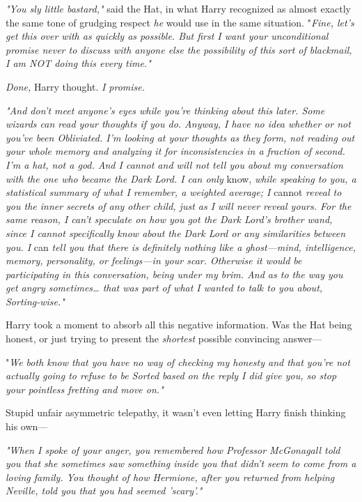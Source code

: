 \emph{"You sly little bastard,"} said the Hat, in what Harry recognized as almost exactly the same tone of grudging respect \emph{he} would use in the same situation. "\emph{Fine, let's get this over with as quickly as possible. But first I want your unconditional promise never to discuss with anyone else the possibility of this sort of blackmail, I am NOT doing this every time."}

\emph{Done,} Harry thought. \emph{I promise.}

\emph{"And don't meet anyone's eyes while you're thinking about this later. Some wizards can read your thoughts if you do. Anyway, I have no idea whether or not you've been Obliviated. I'm looking at your thoughts as they form, not reading out your whole memory and analyzing it for inconsistencies in a fraction of second. I'm a hat, not a god. And I cannot and will not tell you about my conversation with the one who became the Dark Lord. I can only} know,\emph{ while speaking to you, a statistical summary of what I remember, a weighted average; I} cannot\emph{ reveal to you the inner secrets of any other child, just as I will never reveal yours. For the same reason, I can't speculate on how you got the Dark Lord's brother wand, since I cannot specifically know about the Dark Lord or any similarities between you. I} can\emph{ tell you that there is definitely nothing like a ghost---mind, intelligence, memory, personality, or feelings---in your scar. Otherwise it would be participating in this conversation, being under my brim. And as to the way you get angry sometimes{\ldots} that was part of what I wanted to talk to you about, Sorting-wise."}

Harry took a moment to absorb all this negative information. Was the Hat being honest, or just trying to present the \emph{shortest} possible convincing answer---

"\emph{We both know that you have no way of checking my honesty and that you're not actually going to refuse to be Sorted based on the reply I did give you, so stop your pointless fretting and move on."}

Stupid unfair asymmetric telepathy, it wasn't even letting Harry finish thinking his own---

\emph{"When I spoke of your anger, you remembered how Professor McGonagall told you that she sometimes saw something inside you that didn't seem to come from a loving family. You thought of how Hermione, after you returned from helping Neville, told you that you had seemed 'scary'."}

